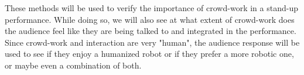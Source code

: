 \documentclass[onecolumn, draftclsnofoot,10pt, compsoc]{IEEEtran}
\begin{document}
These methods will be used to verify the importance of crowd-work in a stand-up performance. While doing so, we will also see at what extent of crowd-work does the audience feel like they are being talked to and integrated in the performance. Since crowd-work and interaction are very "human", the audience response will be used to see if they enjoy a humanized robot or if they prefer a more robotic one, or maybe even a combination of both.

\pagebreak




\end{document}
